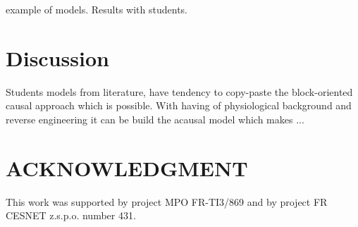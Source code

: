 \documentclass[letterpaper, 10 pt, conference]{ieeeconf}  %
\begin{document}
example of models. Results with students.









\section{Discussion}

Students models from literature, have tendency to copy-paste the block-oriented causal approach  which is possible.
With having of physiological background and reverse engineering it can be build the acausal model which makes ...


\section*{ACKNOWLEDGMENT}
This work was supported by project MPO FR-TI3/869 and by project FR CESNET z.s.p.o. number 431.



\end{document}
